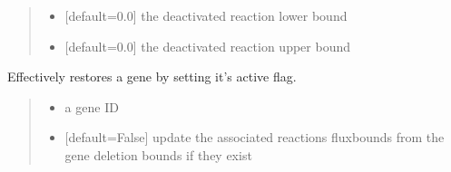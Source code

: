\documentclass[letterpaper,12pt,english]{sphinxmanual}
\begin{document}
\begin{fulllineitems}
\begin{fulllineitems}
\begin{quote}
\begin{description}
\begin{itemize}
\item {} 
\sphinxAtStartPar
{} \textendash{} {[}default=0.0{]} the deactivated reaction lower bound

\item {} 
\sphinxAtStartPar
{} \textendash{} {[}default=0.0{]} the deactivated reaction upper bound

\end{itemize}

\end{description}\end{quote}

\end{fulllineitems}


\begin{fulllineitems}
\label{\detokenize{api/core:cbmpy.CBModel.Model.setGeneActive}}
\pysigstartsignatures
\pysiglinewithargsret
{}
{\sphinxparamcomma {}}
{}
\pysigstopsignatures
\sphinxAtStartPar
Effectively restores a gene by setting it’s active flag.
\begin{quote}\begin{description}
\begin{itemize}
\item {} 
\sphinxAtStartPar
{} \textendash{} a gene ID

\item {} 
\sphinxAtStartPar
{} \textendash{} {[}default=False{]} update the associated reactions fluxbounds from the gene deletion bounds if they exist

\end{itemize}

\end{description}\end{quote}

\end{fulllineitems}



\end{fulllineitems}
\end{document}
